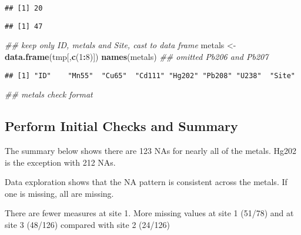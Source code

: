 \documentclass[]{article}
\newenvironment{Shaded}{\begin{snugshade}}{\end{snugshade}}
\newcommand{\CommentTok}[1]{\textcolor[rgb]{0.56,0.35,0.01}{\textit{#1}}}
\newcommand{\DecValTok}[1]{\textcolor[rgb]{0.00,0.00,0.81}{#1}}
\newcommand{\KeywordTok}[1]{\textcolor[rgb]{0.13,0.29,0.53}{\textbf{#1}}}
\newcommand{\NormalTok}[1]{#1}
\newcommand{\OperatorTok}[1]{\textcolor[rgb]{0.81,0.36,0.00}{\textbf{#1}}}
\newcommand{\StringTok}[1]{\textcolor[rgb]{0.31,0.60,0.02}{#1}}
\begin{document}
\begin{verbatim}
## [1] 20
\end{verbatim}

\begin{Shaded}
\end{Shaded}

\begin{verbatim}
## [1] 47
\end{verbatim}

\begin{Shaded}
\begin{Highlighting}[]
\CommentTok{## keep only ID, metals and Site, cast to data frame}
\NormalTok{metals <-}\StringTok{ }\KeywordTok{data.frame}\NormalTok{(tmp[,}\KeywordTok{c}\NormalTok{(}\DecValTok{1}\OperatorTok{:}\DecValTok{8}\NormalTok{)])}
\KeywordTok{names}\NormalTok{(metals)  }\CommentTok{## omitted Pb206 and Pb207}
\end{Highlighting}
\end{Shaded}

\begin{verbatim}
## [1] "ID"    "Mn55"  "Cu65"  "Cd111" "Hg202" "Pb208" "U238"  "Site"
\end{verbatim}

\begin{Shaded}
\begin{Highlighting}[]
\CommentTok{## metals check format}
\end{Highlighting}
\end{Shaded}

\hypertarget{perform-initial-checks-and-summary}{%
\subsection{Perform Initial Checks and
Summary}\label{perform-initial-checks-and-summary}}

The summary below shows there are 123 NAs for nearly all of the metals.
Hg202 is the exception with 212 NAs.

Data exploration shows that the NA pattern is consistent across the
metals. If one is missing, all are missing.

There are fewer measures at site 1. More missing values at site 1
(51/78) and at site 3 (48/126) compared with site 2 (24/126)
\end{document}
